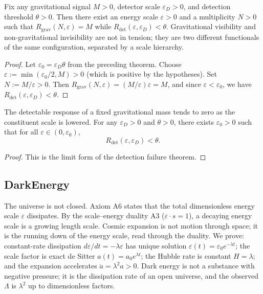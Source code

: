 \begin{theorem}
Fix any gravitational signal $M > 0$, detector scale $\varepsilon_D > 0$, and detection threshold $\theta > 0$. Then there exist an energy scale $\varepsilon > 0$ and a multiplicity $N > 0$ such that $R_{\text{grav}}(N, \varepsilon) = M$ while $R_{\text{det}}(\varepsilon, \varepsilon_D) < \theta$. Gravitational visibility and non-gravitational invisibility are not in tension; they are two different functionals of the same configuration, separated by a scale hierarchy.
\end{theorem}

\begin{proof}
Let $\varepsilon_0 = \varepsilon_D \theta$ from the preceding theorem. Choose $\varepsilon := \min(\varepsilon_0/2, M) > 0$ (which is positive by the hypotheses). Set $N := M/\varepsilon > 0$. Then $R_{\text{grav}}(N, \varepsilon) = (M/\varepsilon) \varepsilon = M$, and since $\varepsilon < \varepsilon_0$, we have $R_{\text{det}}(\varepsilon, \varepsilon_D) < \theta$.
\end{proof}

\begin{theorem}
The detectable response of a fixed gravitational mass tends to zero as the constituent scale is lowered. For any $\varepsilon_D > 0$ and $\theta > 0$, there exists $\varepsilon_0 > 0$ such that for all $\varepsilon \in (0, \varepsilon_0)$,
\begin{equation}
R_{\text{det}}(\varepsilon, \varepsilon_D) < \theta .
\end{equation}
\end{theorem}

\begin{proof}
This is the limit form of the detection failure theorem.
\end{proof}

\subsection{DarkEnergy}

The universe is not closed. Axiom A6 states that the total dimensionless energy scale $\varepsilon$ dissipates. By the scale–energy duality A3 ($\varepsilon \cdot s = 1$), a decaying energy scale is a growing length scale. Cosmic expansion is not motion through space; it is the running down of the energy scale, read through the duality. We prove: constant-rate dissipation $d\varepsilon/dt = -\lambda \varepsilon$ has unique solution $\varepsilon(t) = \varepsilon_0 e^{-\lambda t}$; the scale factor is exact de Sitter $a(t) = a_0 e^{\lambda t}$; the Hubble rate is constant $H = \lambda$; and the expansion accelerates $\ddot{a} = \lambda^2 a > 0$. Dark energy is not a substance with negative pressure; it is the dissipation rate of an open universe, and the observed $\Lambda$ is $\lambda^2$ up to dimensionless factors.

